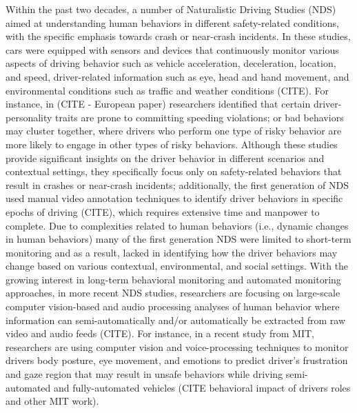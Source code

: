   Within the past two decades, a number of Naturalistic Driving Studies (NDS) aimed at understanding human behaviors in different safety-related conditions, with the specific emphasis towards crash or near-crash incidents. In these studies, cars were equipped with sensors and devices that continuously monitor various aspects of driving behavior such as vehicle acceleration, deceleration, location, and speed, driver-related information such as eye, head and hand movement, and environmental conditions such as traffic and weather conditions (CITE). For instance, in (CITE - European paper) researchers identified that certain driver-personality traits are prone to committing speeding violations; or bad behaviors may cluster together, where drivers who perform one type of risky behavior are more likely to engage in other types of risky behaviors. Although these studies provide significant insights on the driver behavior in different scenarios and contextual settings, they specifically focus only on safety-related behaviors that result in crashes or near-crash incidents; additionally, the first generation of NDS used manual video annotation techniques to identify driver behaviors in specific epochs of driving (CITE), which requires extensive time and manpower to complete. Due to complexities related to human behaviors (i.e., dynamic changes in human behaviors) many of the first generation NDS were limited to short-term monitoring and as a result, lacked in identifying how the driver behaviors may change based on various contextual, environmental, and social settings. With the growing interest in long-term behavioral monitoring and automated monitoring approaches, in more recent NDS studies, researchers are focusing on large-scale computer vision-based and audio processing analyses of human behavior where information can  semi-automatically and/or automatically be extracted from raw video and audio feeds (CITE). For instance, in a recent study from MIT, researchers are using computer vision and voice-processing techniques to monitor drivers body posture, eye movement, and emotions to predict driver's frustration and gaze region that may result in unsafe behaviors while driving semi-automated and fully-automated vehicles (CITE behavioral impact of drivers roles and other MIT work). 
  
